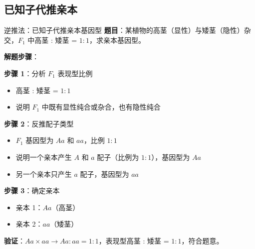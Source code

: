 \documentclass[a4paper,11pt]{ctexart}
\begin{document}
\subsection{已知子代推亲本}

\begin{examplebox}{逆推法：已知子代推亲本基因型}
\textbf{题目}：某植物的高茎（显性）与矮茎（隐性）杂交，$F_1$ 中高茎 : 矮茎 = $1:1$，求亲本基因型。

\textbf{解题步骤}：

\textbf{步骤 1}：分析 $F_1$ 表现型比例
\begin{itemize}[leftmargin=2em]
    \item 高茎 : 矮茎 = $1:1$
    \item 说明 $F_1$ 中既有显性纯合或杂合，也有隐性纯合
\end{itemize}

\textbf{步骤 2}：反推配子类型
\begin{itemize}[leftmargin=2em]
    \item $F_1$ 基因型为 $Aa$ 和 $aa$，比例 $1:1$
    \item 说明一个亲本产生 $A$ 和 $a$ 配子（比例为 $1:1$），基因型为 $Aa$
    \item 另一个亲本只产生 $a$ 配子，基因型为 $aa$
\end{itemize}

\textbf{步骤 3}：确定亲本
\begin{itemize}[leftmargin=2em]
    \item 亲本 1：$Aa$（高茎）
    \item 亲本 2：$aa$（矮茎）
\end{itemize}

\textbf{验证}：$Aa \times aa \to Aa : aa = 1:1$，表现型高茎 : 矮茎 = $1:1$，符合题意。
\end{examplebox}
\end{document}
